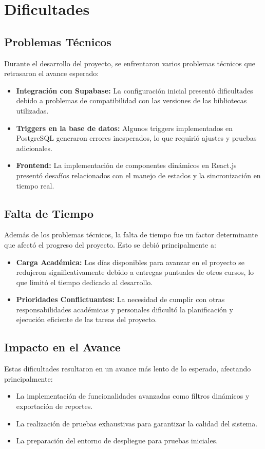 \section{Dificultades}

\subsection{Problemas Técnicos}
Durante el desarrollo del proyecto, se enfrentaron varios problemas técnicos que retrasaron el avance esperado:
\begin{itemize}
    \item \textbf{Integración con Supabase:} La configuración inicial presentó dificultades debido a problemas de compatibilidad con las versiones de las bibliotecas utilizadas.
    \item \textbf{Triggers en la base de datos:} Algunos triggers implementados en PostgreSQL generaron errores inesperados, lo que requirió ajustes y pruebas adicionales.
    \item \textbf{Frontend:} La implementación de componentes dinámicos en React.js presentó desafíos relacionados con el manejo de estados y la sincronización en tiempo real.
\end{itemize}

\subsection{Falta de Tiempo}
Además de los problemas técnicos, la falta de tiempo fue un factor determinante que afectó el progreso del proyecto. Esto se debió principalmente a:
\begin{itemize}
    \item \textbf{Carga Académica:} Los días disponibles para avanzar en el proyecto se redujeron significativamente debido a entregas puntuales de otros cursos, lo que limitó el tiempo dedicado al desarrollo.
    \item \textbf{Prioridades Conflictuantes:} La necesidad de cumplir con otras responsabilidades académicas y personales dificultó la planificación y ejecución eficiente de las tareas del proyecto.
\end{itemize}

\subsection{Impacto en el Avance}
Estas dificultades resultaron en un avance más lento de lo esperado, afectando principalmente:
\begin{itemize}
    \item La implementación de funcionalidades avanzadas como filtros dinámicos y exportación de reportes.
    \item La realización de pruebas exhaustivas para garantizar la calidad del sistema.
    \item La preparación del entorno de despliegue para pruebas iniciales.
\end{itemize}


